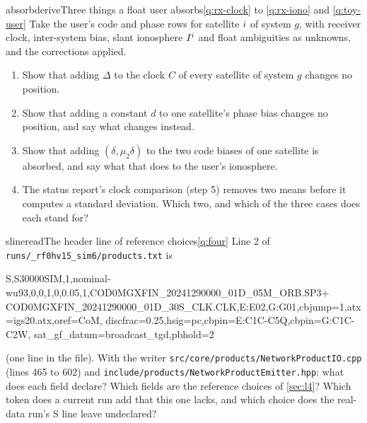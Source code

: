 \begin{question}{absorb}{derive}{Three things a float user absorbs}{\ref{q:rx-clock} to \ref{q:rx-iono} and \ref{q:toy-user}}
Take the user's code and phase rows for satellite $i$ of system $g$, with
receiver clock, inter-system bias, slant ionosphere $I^i$ and float
ambiguities as unknowns, and the corrections applied.
\begin{enumerate}[leftmargin=*, itemsep=1pt]
\item Show that adding $\Delta$ to the clock $C$ of every satellite of system $g$
      changes no position.
\item Show that adding a constant $d$ to one satellite's phase bias changes no
      position, and say what changes instead.
\item Show that adding $(\delta, \mu_2\delta)$ to the two code biases of one
      satellite is absorbed, and say what that does to the user's ionosphere.
\item The status report's clock comparison (step 5) removes two means before it
      computes a standard deviation. Which two, and which of the three cases does
      each stand for?
\end{enumerate}
\end{question}

\begin{question}{sline}{read}{The header line of reference choices}{\ref{q:four}}
Line 2 of \texttt{runs/\_rf0hv15\_sim6/products.txt} is
\begin{cmd}
S,S30000SIM,1,nominal-wu93,0,0,1,0,0.05,1,COD0MGXFIN_20241290000_01D_05M_ORB.SP3+
  COD0MGXFIN_20241290000_01D_30S_CLK.CLK,E:E02,G:G01,cbjump=1,atx=igs20.atx,oref=CoM,
  discfrac=0.25,hsig=pc,cbpin=E:C1C-C5Q,cbpin=G:C1C-C2W,
  sat_gf_datum=broadcast_tgd,pbhold=2
\end{cmd}
(one line in the file). With the writer \texttt{src/core/products/NetworkProductIO.cpp}
(lines 465 to 602) and \texttt{include/products/NetworkProductEmitter.hpp}: what
does each field declare? Which fields are the reference choices of
\cref{sec:l4}? Which token does a current run add that this one lacks, and which
choice does the real-data run's S line leave undeclared?
\end{question}

